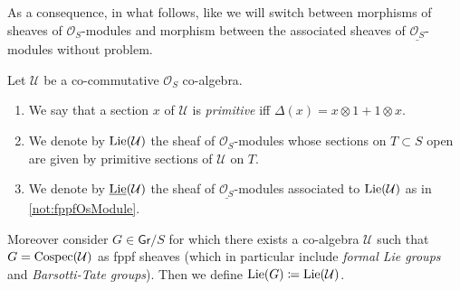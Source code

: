 \begin{rem}[]
	As a consequence, in what follows, like \cite[]{Messing} we will switch
	between morphisms of sheaves of $\mathcal{O}_{ S }$-modules and morphism
	between the associated sheaves of $\underline{\mathcal{O}_{ S }}$-modules without problem.
\end{rem}


\begin{defn}[]
	Let $\mathcal{U}$ be a co-commutative \(\mathcal{O}_{ S }\) co-algebra.
\begin{enumerate}
\item We say that a section $x$ of $\mathcal{U}$ is \emph{primitive} iff
	$\Delta(x) = x \otimes 1 + 1 \otimes x$.

\item We denote by $\operatorname{Lie}(\mathcal{U})$ the sheaf of $\mathcal{O}_{ S }$-modules
	whose sections on $T \subset S$ open are given by
	primitive sections of $\mathcal{U}$ on $T$.

\item We denote by $\underline{\operatorname{Lie}}(\mathcal{U})$ 
	the sheaf of $\underline{\mathcal{O}_{ S }}$-modules
	associated to $\operatorname{Lie}(\mathcal{U})$ as in \cref{not:fppfOsModule}.
\end{enumerate}
	Moreover consider $G \in \mathsf{Gr}/S$ for which there exists a
	co-algebra $\mathcal{U}$ such that $G = \operatorname{Cospec}(\mathcal{U})$ as
	fppf sheaves (which in particular include \emph{formal Lie groups} and \emph{Barsotti-Tate groups}).
	Then we define $\operatorname{Lie}(G) \coloneqq \operatorname{Lie}(\mathcal{U})$.
\end{defn}


